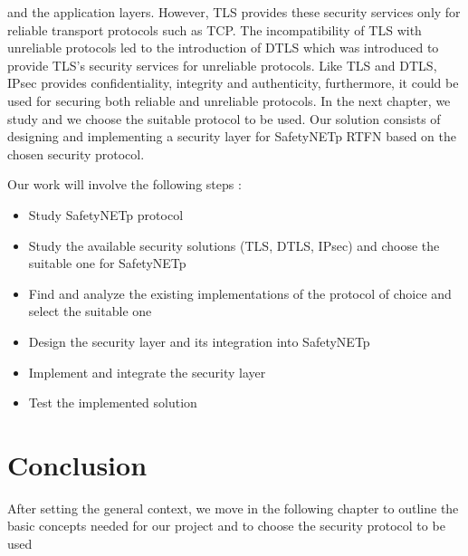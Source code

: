 and the application layers. However, \ac{TLS} provides these security services only for reliable transport protocols such as \ac{TCP}.
The incompatibility of \ac{TLS} with unreliable protocols led to the introduction of \ac{DTLS} which was introduced to provide \ac{TLS}'s security services for unreliable protocols.
Like \ac{TLS} and \ac{DTLS}, \ac{IPsec} provides confidentiality, integrity and authenticity, furthermore, it could be used for securing both
reliable and unreliable protocols.
In the next chapter, we study and we choose the suitable protocol to be used. Our solution consists of
designing and implementing a security layer for SafetyNETp RTFN based on the chosen security protocol.

Our work will involve the following steps :
\renewcommand{\labelitemi}{$\bullet$}
\begin{itemize}
\item Study SafetyNETp protocol
\item Study the available security solutions (\ac{TLS}, \ac{DTLS}, \ac{IPsec}) and choose the suitable one for SafetyNETp
\item Find and analyze the existing implementations of the protocol of choice and select the suitable one
\item Design the security layer and its integration into SafetyNETp
\item Implement and integrate the security layer
\item Test the implemented solution
\end{itemize}

\section*{Conclusion}

After setting the general context, we move in the following chapter to
outline the basic concepts needed for our project and to choose the security
protocol to be used

